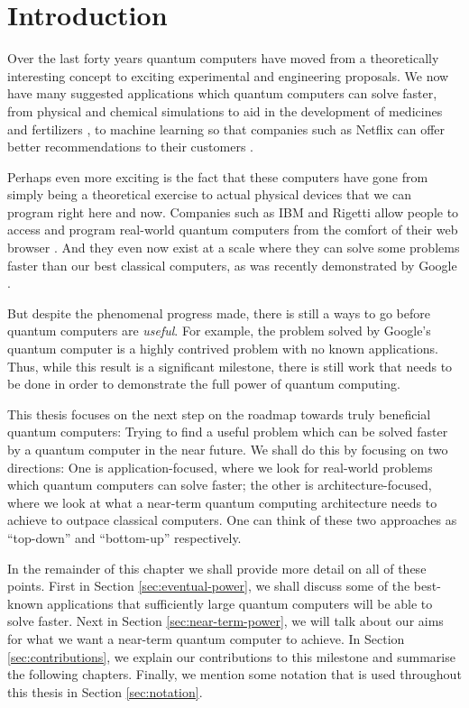 \chapter{Introduction}

Over the last forty years quantum computers have moved from a theoretically interesting concept to exciting experimental and engineering proposals. We now have many suggested applications which quantum computers can solve faster, from physical and chemical simulations to aid in the development of medicines and fertilizers \cite{berry2019}, to machine learning so that companies such as Netflix can offer better recommendations to their customers \cite{kerenidis2017}.

Perhaps even more exciting is the fact that these computers have gone from simply being a theoretical exercise to actual physical devices that we can program right here and now. Companies such as IBM and Rigetti allow people to access and program real-world quantum computers from the comfort of their web browser \cite{ibm, rigetti}. And they even now exist at a scale where they can solve some problems faster than our best classical computers, as was recently demonstrated by Google \cite{arute2019}.

But despite the phenomenal progress made, there is still a ways to go before quantum computers are \emph{useful}. For example, the problem solved by Google's quantum computer is a highly contrived problem with no known applications. Thus, while this result is a significant milestone, there is still work that needs to be done in order to demonstrate the full power of quantum computing.

This thesis focuses on the next step on the roadmap towards truly beneficial quantum computers: Trying to find a useful problem which can be solved faster by a quantum computer in the near future. We shall do this by focusing on two directions: One is application-focused, where we look for real-world problems which quantum computers can solve faster; the other is architecture-focused, where we look at what a near-term quantum computing architecture needs to achieve to outpace classical computers. One can think of these two approaches as ``top-down'' and ``bottom-up'' respectively.

In the remainder of this chapter we shall provide more detail on all of these points. First in Section \ref{sec:eventual-power}, we shall discuss some of the best-known applications that sufficiently large quantum computers will be able to solve faster. Next in Section \ref{sec:near-term-power}, we will talk about our aims for what we want a near-term quantum computer to achieve. In Section \ref{sec:contributions}, we explain our contributions to this milestone and summarise the following chapters. Finally, we mention some notation that is used throughout this thesis in Section \ref{sec:notation}.

